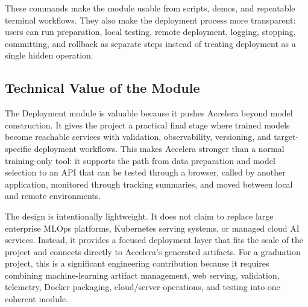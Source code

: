 These commands make the module usable from scripts, demos, and repeatable
terminal workflows. They also make the deployment process more transparent:
users can run preparation, local testing, remote deployment, logging, stopping,
committing, and rollback as separate steps instead of treating deployment as a
single hidden operation.

\subsection{Technical Value of the Module}
\noindent The Deployment module is valuable because it pushes Accelera beyond
model construction. It gives the project a practical final stage where trained
models become reachable services with validation, observability, versioning,
and target-specific deployment workflows. This makes Accelera stronger than a
normal training-only tool: it supports the path from data preparation and model
selection to an API that can be tested through a browser, called by another
application, monitored through tracking summaries, and moved between local and
remote environments.

The design is intentionally lightweight. It does not claim to replace large
enterprise MLOps platforms, Kubernetes serving systems, or managed cloud AI
services. Instead, it provides a focused deployment layer that fits the scale of
the project and connects directly to Accelera's generated artifacts. For a
graduation project, this is a significant engineering contribution because it
requires combining machine-learning artifact management, web serving,
validation, telemetry, Docker packaging, cloud/server operations, and testing
into one coherent module.
